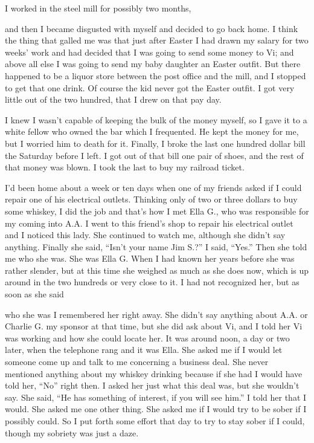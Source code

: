 I worked in the steel mill for possibly two months,

and then I became disgusted with myself and decided to go back home. I think the thing that galled me was that just after Easter I had drawn my salary for two weeks’ work and had decided that I was going to send some money to Vi; and above all else I was going to send my baby daughter an Easter outfit. But there happened to be a liquor store between the post office and the mill, and I stopped to get that one drink. Of course the kid never got the Easter outfit. I got very little out of the two hundred, that I drew on that pay day.

I knew I wasn’t capable of keeping the bulk of the money myself, so I gave it to a white fellow who owned the bar which I frequented. He kept the money for me, but I worried him to death for it. Finally, I broke the last one hundred dollar bill the Saturday before I left. I got out of that bill one pair of shoes, and the rest of that money was blown. I took the last to buy my railroad ticket.

I’d been home about a week or ten days when one of my friends asked if I could repair one of his electrical outlets. Thinking only of two or three dollars to buy some whiskey, I did the job and that’s how I met Ella G., who was responsible for my coming into A.A. I went to this friend’s shop to repair his electrical outlet and I noticed this lady. She continued to watch me, although she didn’t say anything. Finally she said, “Isn’t your name Jim S.?” I said, “Yes.” Then she told me who she was. She was Ella G. When I had known her years before she was rather slender, but at this time she weighed as much as she does now, which is up around in the two hundreds or very close to it. I had not recognized her, but as soon as she said

who she was I remembered her right away. She didn’t say anything about A.A. or Charlie G. my sponsor at that time, but she did ask about Vi, and I told her Vi was working and how she could locate her. It was around noon, a day or two later, when the telephone rang and it was Ella. She asked me if I would let someone come up and talk to me concerning a business deal. She never mentioned anything about my whiskey drinking because if she had I would have told her, “No” right then. I asked her just what this deal was, but she wouldn’t say. She said, “He has something of interest, if you will see him.” I told her that I would. She asked me one other thing. She asked me if I would try to be sober if I possibly could. So I put forth some effort that day to try to stay sober if I could, though my sobriety was just a daze.

